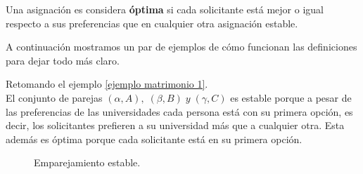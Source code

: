 \begin{dfn}{\cite{GaleShapley}}
\label{optima}
Una asignación es considera \textbf{óptima} si cada solicitante está mejor o igual respecto a sus preferencias que en cualquier otra asignación estable. 
\end{dfn}

A continuación mostramos un par de ejemplos de cómo funcionan las definiciones para dejar todo más claro. 

\begin{eje}
Retomando el ejemplo \ref{ejemplo matrimonio 1}. \\
El conjunto de parejas $(\alpha, A), \; (\beta, B)\; y\; (\gamma, C)$ es estable porque a pesar de las preferencias de las universidades cada persona está con su primera opción, es decir, los solicitantes prefieren a su universidad más que a cualquier otra. Esta además es óptima porque cada solicitante está en su primera opción.
\begin{figure}[H]\centering


\caption{Emparejamiento estable.}
\end{figure}

\fin
\end{eje}

